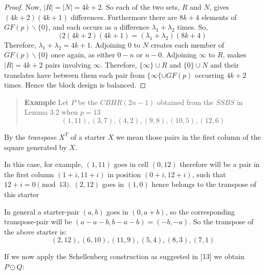 \documentclass[
  11pt,
  a4paper]{book}
\newcounter{examplecounter}
\begin{document}
\begin{proof}
    Now, $|R| = |N| = 4k+2$. So each of the two sets, $R$
    and $N$, gives $(4k + 2)(4k + 1)$ differences. Furthermore
    there are $8k + 4$ elements of $GF(p) \backslash \{0\}$,
    and each occurs as a difference
    $\lambda _1 + \lambda _2$ times. So,
    $$(2(4k + 2)(4k + 1) = (\lambda _1 + \lambda _2)(8k + 4)$$
    Therefore, $\lambda _1 + \lambda _2 = 4k+1$.
    Adjoining 0 to $N$ creates each member of
    $GF(p) \backslash \{0\}$ once again, as either $0-n$ or
    $n-0$.
    Adjoining $\infty$ to $R$, makes $|R| = 4k + 2$ pairs
    involving $\infty$. Therefore, $\{\infty\} \cup R$ and
    $\{0\} \cup N$ and their translates have between them
    each pair from $\{\infty\{ \cup GF(p)$ occurring $4k + 2$
    times. Hence the block design is balanced.
\end{proof}

\begin{quote}  \textbf{Example } \quad 
Let $P$ be the $CBHR(2n-1)$ obtained from the $SSBS$ in
Lemma 3.2 when $p=13$
$$(1,11),(3,7),(4,2),(9,8),(10,5),(12,6)$$
 \end{quote}

By the \emph{transpose} \(X^T\) of a starter \(X\) we mean those
pairs in the first column of the square generated by \(X\).

In this case, for example, \((1, 11)\) goes in cell \((0, 12)\)
therefore will be a pair in the first column
\((1 + i, 11 + i)\) in position \((0 + i, 12 + i)\), such that
\(12 + i = 0\pmod 13\). \((2, 12)\) goes in \((1, 0)\) hence
belongs to the transpose of this starter

In general a starter-pair \((a, b)\) goes in \((0, a +b)\),
so the corresponding transpose-pair will be
\((a - a - b, b - a - b) = (-b, -a)\). So the transpose of
the above starter is:
\[(2, 12), (6, 10), (11, 9), (5, 4), (8, 3), (7, 1)\]

If we now apply the Schellenberg construction as suggested
in {[}13{]} we obtain \(P \odot Q\):
\end{document}
